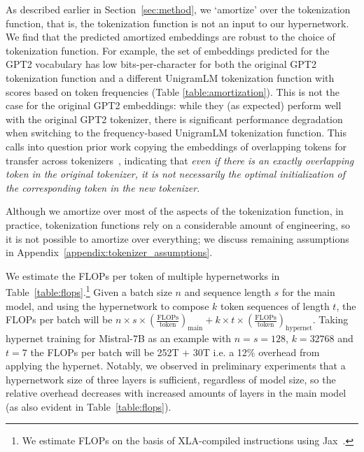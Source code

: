 \documentclass{article}
\begin{document}
As described earlier in Section~\ref{sec:method}, we `amortize' over the tokenization function, that is, the tokenization function is not an input to our hypernetwork. We find that the predicted amortized embeddings are robust to the choice of tokenization function. For example, the set of embeddings predicted for the GPT2 vocabulary has low bits-per-character for both the original GPT2 tokenization function and a different UnigramLM tokenization function with scores based on token frequencies (Table \ref{table:amortization}). This is not the case for the original GPT2 embeddings: while they (as expected) perform well with the original GPT2 tokenizer, there is significant performance degradation when switching to the frequency-based UnigramLM tokenization function. This calls into question prior work copying the embeddings of overlapping tokens for transfer across tokenizers~\citep[][among others]{dobler-de-melo-2023-focus,gee-etal-2022-fast}, indicating that \textit{even if there is an exactly overlapping token in the original tokenizer, it is not necessarily the optimal initialization of the corresponding token in the new tokenizer}. 

Although we amortize over most of the aspects of the tokenization function, in practice, tokenization functions rely on a considerable amount of engineering, so it is not possible to amortize over everything; we discuss remaining assumptions in Appendix~\ref{appendix:tokenizer_assumptions}.



 We estimate the FLOPs per token of multiple hypernetworks in Table~\ref{table:flops}.\footnote{We estimate FLOPs on the basis of XLA-compiled instructions using Jax~\citep{jax2018github}.} Given a batch size $n$ and sequence length $s$ for the main model, and using the hypernetwork to compose $k$ token sequences of length $t$, the FLOPs per batch will be $n \times s \times (\frac{\text{FLOPs}}{\text{token}})_{\text{main}} + k \times t \times (\frac{\text{FLOPs}}{\text{token}})_{\text{hypernet}}$. Taking hypernet training for Mistral-7B as an example with $n = s = 128$, $k=32768$ and $t = 7$ the FLOPs per batch will be 252T + 30T i.e. a 12\% overhead from applying the hypernet. Notably, we observed in preliminary experiments that a hypernetwork size of three layers is sufficient, regardless of model size, so the relative overhead decreases with increased amounts of layers in the main model (as also evident in Table~\ref{table:flops}).
\end{document}
